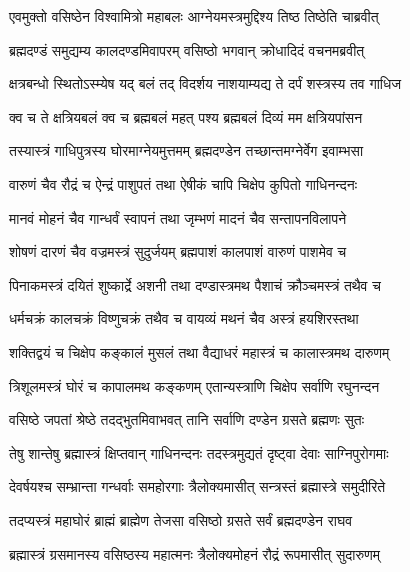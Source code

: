 
\twolineshloka
{एवमुक्तो वसिष्ठेन विश्वामित्रो महाबलः}
{आग्नेयमस्त्रमुद्दिश्य तिष्ठ तिष्ठेति चाब्रवीत्} %

\twolineshloka
{ब्रह्मदण्डं समुद्यम्य कालदण्डमिवापरम्}
{वसिष्ठो भगवान् क्रोधादिदं वचनमब्रवीत्} %

\twolineshloka
{क्षत्रबन्धो स्थितोऽस्म्येष यद् बलं तद् विदर्शय}
{नाशयाम्यद्य ते दर्पं शस्त्रस्य तव गाधिज} %

\twolineshloka
{क्व च ते क्षत्रियबलं क्व च ब्रह्मबलं महत्}
{पश्य ब्रह्मबलं दिव्यं मम क्षत्रियपांसन} %

\twolineshloka
{तस्यास्त्रं गाधिपुत्रस्य घोरमाग्नेयमुत्तमम्}
{ब्रह्मदण्डेन तच्छान्तमग्नेर्वेग इवाम्भसा} %

\twolineshloka
{वारुणं चैव रौद्रं च ऐन्द्रं पाशुपतं तथा}
{ऐषीकं चापि चिक्षेप कुपितो गाधिनन्दनः} %

\twolineshloka
{मानवं मोहनं चैव गान्धर्वं स्वापनं तथा}
{जृम्भणं मादनं चैव सन्तापनविलापने} %

\twolineshloka
{शोषणं दारणं चैव वज्रमस्त्रं सुदुर्जयम्}
{ब्रह्मपाशं कालपाशं वारुणं पाशमेव च} %

\twolineshloka
{पिनाकमस्त्रं दयितं शुष्कार्द्रे अशनी तथा}
{दण्डास्त्रमथ पैशाचं क्रौञ्चमस्त्रं तथैव च} %

\twolineshloka
{धर्मचक्रं कालचक्रं विष्णुचक्रं तथैव च}
{वायव्यं मथनं चैव अस्त्रं हयशिरस्तथा} %

\twolineshloka
{शक्तिद्वयं च चिक्षेप कङ्कालं मुसलं तथा}
{वैद्याधरं महास्त्रं च कालास्त्रमथ दारुणम्} %

\twolineshloka
{त्रिशूलमस्त्रं घोरं च कापालमथ कङ्कणम्}
{एतान्यस्त्राणि चिक्षेप सर्वाणि रघुनन्दन} %

\twolineshloka
{वसिष्ठे जपतां श्रेष्ठे तदद्भुतमिवाभवत्}
{तानि सर्वाणि दण्डेन ग्रसते ब्रह्मणः सुतः} %

\twolineshloka
{तेषु शान्तेषु ब्रह्मास्त्रं क्षिप्तवान् गाधिनन्दनः}
{तदस्त्रमुद्यतं दृष्ट्वा देवाः साग्निपुरोगमाः} %

\twolineshloka
{देवर्षयश्च सम्भ्रान्ता गन्धर्वाः समहोरगाः}
{त्रैलोक्यमासीत् सन्त्रस्तं ब्रह्मास्त्रे समुदीरिते} %

\twolineshloka
{तदप्यस्त्रं महाघोरं ब्राह्मं ब्राह्मेण तेजसा}
{वसिष्ठो ग्रसते सर्वं ब्रह्मदण्डेन राघव} %

\twolineshloka
{ब्रह्मास्त्रं ग्रसमानस्य वसिष्ठस्य महात्मनः}
{त्रैलोक्यमोहनं रौद्रं रूपमासीत् सुदारुणम्} %

